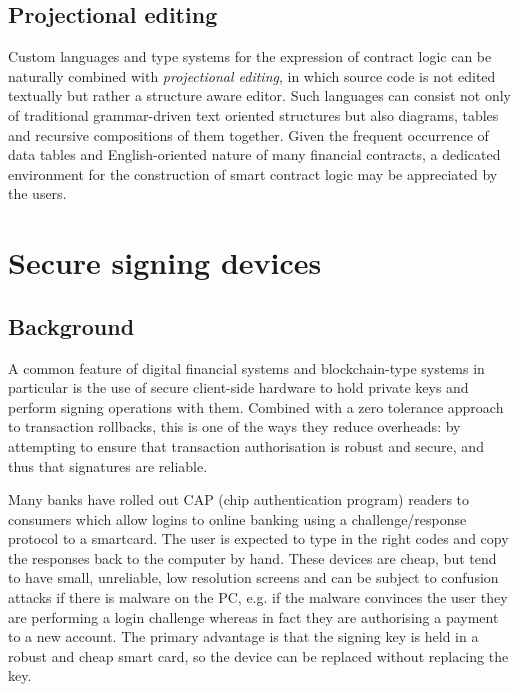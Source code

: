 \documentclass{article}
\begin{document}
\subsection{Projectional editing}

Custom languages and type systems for the expression of contract logic can be naturally combined with \emph{projectional
editing}, in which source code is not edited textually but rather a structure aware
editor\cite{DBLP:conf/models/VoelterL14}. Such languages can consist not only of traditional grammar-driven text
oriented structures but also diagrams, tables and recursive compositions of them together. Given the frequent occurrence
of data tables and English-oriented nature of many financial contracts, a dedicated environment for the construction of
smart contract logic may be appreciated by the users.

\section{Secure signing devices}\label{sec:secure-signing-devices}

\subsection{Background}

A common feature of digital financial systems and blockchain-type systems in particular is the use of secure client-side
hardware to hold private keys and perform signing operations with them. Combined with a zero tolerance approach to
transaction rollbacks, this is one of the ways they reduce overheads: by attempting to ensure that transaction
authorisation is robust and secure, and thus that signatures are reliable.

Many banks have rolled out CAP (chip authentication program) readers to consumers which allow logins to online banking using a
challenge/response protocol to a smartcard. The user is expected to type in the right codes and copy the responses back
to the computer by hand. These devices are cheap, but tend to have small, unreliable, low resolution screens and can be
subject to confusion attacks if there is malware on the PC, e.g. if the malware convinces the user they are performing
a login challenge whereas in fact they are authorising a payment to a new account. The primary advantage is that the
signing key is held in a robust and cheap smart card, so the device can be replaced without replacing the key.
\end{document}
